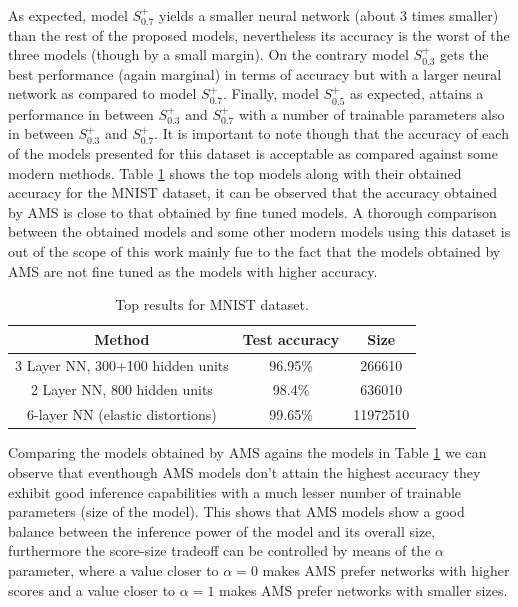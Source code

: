 \documentclass[journal]{IEEEtran}
\begin{document}
As expected, model $S^+_{0.7}$ yields a smaller neural network (about 3 times smaller) than the rest of the proposed models, nevertheless its accuracy is the worst of the three models (though by a small margin). On the contrary model $S^+_{0.3}$ gets the best performance (again marginal) in terms of accuracy but with a larger neural network as compared to model $S^+_{0.7}$. Finally, model $S^+_{0.5}$ as expected, attains a performance in between $S^+_{0.3}$ and $S^+_{0.7}$ with a number of trainable parameters also in between $S^+_{0.3}$ and $S^+_{0.7}$. It is important to note though that the accuracy of each of the models presented for this dataset is acceptable as compared against some modern methods. Table \ref{table:MNIST_results_top} shows the top models along with their obtained accuracy for the MNIST dataset, it can be observed that the accuracy obtained by AMS is close to that obtained by fine tuned models. A thorough comparison between the obtained models and some other modern models using this dataset is out of the scope of this work mainly fue to the fact that the models obtained by AMS are not fine tuned as the models with higher accuracy.

\begin{table}[!htb]
\begin{center}
\begin{tabular}{| c | c | c |}
\hline
Method & Test accuracy & Size\\
\hline
3 Layer NN, 300+100 hidden units \cite{lecun-98} &  96.95\% & 266610\\
2 Layer NN, 800 hidden units \cite{Simard2003} & 98.4\% & 636010\\
6-layer NN (elastic distortions) \cite{Ciresan2010}  & 99.65\% & 11972510\\
\hline
\end{tabular}
\end{center}
\caption{Top results for MNIST dataset.}
\label{table:MNIST_results_top}
\end{table}

Comparing the models obtained by AMS agains the models in Table \ref{table:MNIST_results_top} we can observe that eventhough AMS models don't attain the highest accuracy they exhibit good inference capabilities with a much lesser number of trainable parameters (size of the model). This shows that AMS models show a good balance between the inference power of the model and its overall size, furthermore the score-size tradeoff can be controlled by means of the $\alpha$ parameter, where a value closer to $\alpha=0$ makes AMS prefer networks with higher scores and a value closer to $\alpha = 1$ makes AMS prefer networks with smaller sizes.
\end{document}
